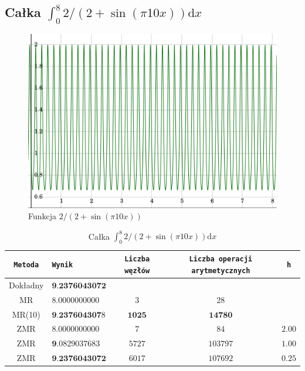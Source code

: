 \documentclass[11pt,leqno]{article}
\begin{document}
\subsection{Całka $\int_{0}^{8}2 / (2 + \sin(\pi10x))\mathrm{d}x$}
\begin{center}\begin{figure}[ht]\begin{center}
    \caption{Funkcja $2 / (2 + \sin(\pi10x))$}
    \includegraphics[scale=0.3,angle=0]{sinpi10x.png}
\end{center}\end{figure}\end{center}
\begin{center}\begin{table}[ht]\begin{center}
    \caption{Całka $\int_{0}^{8}2 / (2 + \sin(\pi10x))\mathrm{d}x$}
    \begin{tabular}{|c|l|c|c|c|} \hline
        \texttt{Metoda} & \texttt{Wynik}            & \texttt{Liczba węzłów} & \texttt{Liczba operacji arytmetycznych} & \texttt{h} \\ \hline
        Dokładny        & $\textbf{9.2376043072}$   &                        &                                         &            \\ \hline
        MR              & $8.0000000000$            & $3$                    & $28$                                    &            \\ \hline
        MR(10)          & $\textbf{9.237604307}8$   & $\textbf{1025}$        & $\textbf{14780}$                        &            \\ \hline
        ZMR             & $8.0000000000$            & $7$                    & $84$                                    & $2.00$     \\ \hline
        ZMR             & $\textbf{9.}0829037683$   & $5727$                 & $103797$                                & $1.00$     \\ \hline
        ZMR             & $\textbf{9.2376043072}$   & $6017$                 & $107692$                                & $0.25$     \\ \hline
    \end{tabular}
\end{center}\end{table}\end{center}
\end{document}
